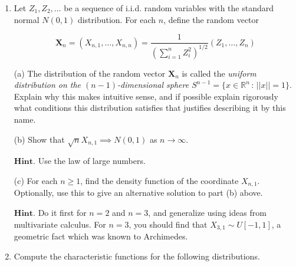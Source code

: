 \documentclass[11pt]{report}
\newcommand{\R}{\mathbb{R}}
\theoremstyle{plain}
\theoremstyle{definition}
\begin{document}
\begin{enumerate}[label=\arabic*.]
\noindent Note: This problem has been whimsically suggested by
Laplace in the 18th century as a way to estimate the
probability that the sun will rise tomorrow, given the
knowledge that it has risen in the last $n$ days. (Of
course, this assumes the unlikely theological scenario
whereby at the dawn of history, a $U(0,1)$ random
number $U$ was drawn, and that subsequently, every
day an independent experiment was performed with
probability $U$ of success, such that if the
experiment is successful then the sun rises.)

$\textbf{Hint.}$ Use the following density version of
the total probability formula: If $A$ is an event and
$X$ is a random variable with density $f_X$, then

\[
\mathrm{P}(A) = \int_{\R} f_X(u) \mathrm{P}(A\ |\ X=u)\,du.
\]

\noindent Note that we have not defined what it means to
condition on a 0-probability event (this is a somewhat
delicate subject that we will not discuss in this
quarter) --- but don't worry about it, it is possible
to use the formula in computations anyway and get
results.

\item Let $Z_1,Z_2,\ldots$ be a sequence of i.i.d. random
variables with the standard normal $N(0,1)$
distribution. For each $n$, define the random vector

\[
\mathbf{X}_n = (X_{n,1},\ldots,X_{n,n}) = \frac{1}{\left(\sum_{i=1}^n Z_i^2\right)^{1/2}}
(Z_1,\ldots,Z_n)
\]

\noindent (a) The distribution of the random vector
$\mathbf{X}_n$ is called the \emph{uniform distribution on
the $(n-1)$-dimensional sphere
$S^{n-1}=\{ x\in \R^n\,:\, ||x||=1 \}$}. Explain why
this makes intuitive sense, and if possible explain
rigorously what conditions this distribution satisfies
that justifies describing it by this name.

(b) Show that $\sqrt{n} X_{n,1} \implies N(0,1)$ as
$n\to\infty$.

$\textbf{Hint.}$ Use the law of large numbers.

(c) For each $n\ge 1$, find the density function of
the coordinate $X_{n,1}$. Optionally, use this to
give an alternative solution to part (b) above.

$\textbf{Hint.}$ Do it first for $n=2$ and $n=3$, and
generalize using ideas from multivariate calculus. For
$n=3$, you should find that $X_{3,1} \sim U[-1,1]$, a
geometric fact which was known to Archimedes.

\item Compute the characteristic functions for the
following distributions.


\end{enumerate}
\end{document}
